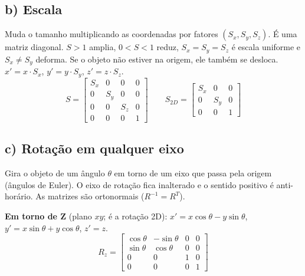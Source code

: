 \documentclass{article}
\begin{document}
\subsection*{b) Escala}

Muda o tamanho multiplicando as coordenadas por fatores $(S_x, S_y, S_z)$. É uma matriz diagonal. $S > 1$ amplia, $0 < S < 1$ reduz, $S_x = S_y = S_z$ é escala uniforme e $S_x \neq S_y$ deforma. Se o objeto não estiver na origem, ele também se desloca. $x' = x \cdot S_x$, $y' = y \cdot S_y$, $z' = z \cdot S_z$.
\[
      S =
      \begin{bmatrix}
            S_x & 0   & 0   & 0 \\
            0   & S_y & 0   & 0 \\
            0   & 0   & S_z & 0 \\
            0   & 0   & 0   & 1
      \end{bmatrix}
      \qquad
      S_{2D} =
      \begin{bmatrix}
            S_x & 0   & 0 \\
            0   & S_y & 0 \\
            0   & 0   & 1
      \end{bmatrix}
\]

\subsection*{c) Rotação em qualquer eixo}

Gira o objeto de um ângulo $\theta$ em torno de um eixo que passa pela origem (ângulos de Euler). O eixo de rotação fica inalterado e o sentido positivo é anti-horário. As matrizes são ortonormais ($R^{-1} = R^T$).

\textbf{Em torno de Z} (plano $xy$; é a rotação 2D): $x' = x\cos\theta - y\sin\theta$, $y' = x\sin\theta + y\cos\theta$, $z' = z$.
\[
      R_z =
      \begin{bmatrix}
            \cos\theta & -\sin\theta & 0 & 0 \\
            \sin\theta & \cos\theta  & 0 & 0 \\
            0          & 0           & 1 & 0 \\
            0          & 0           & 0 & 1
      \end{bmatrix}
\]
\end{document}

